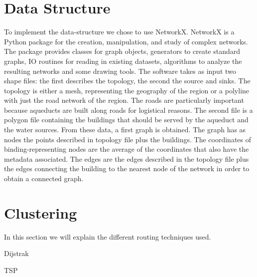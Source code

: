 \section{Data Structure}
\label{data_structure_technical}
To implement the data-structure we chose to use NetworkX. NetworkX is a Python package
for the creation, manipulation, and study of complex networks. The package provides
classes for graph objects, generators to create standard graphs, IO routines for reading in
existing datasets, algorithms to analyze the resulting networks and some drawing tools.
The software takes as input two shape files: the first describes the topology, the second
the source and sinks. The topology is either a mesh, representing the geography of the
region or a polyline with just the road network of the region. The roads are particularly
important because aqueducts are built along roads for logistical reasons. The second file
is a polygon file containing the buildings that should be served by the aqueduct and the
water sources.
From these data, a first graph is obtained. The graph has as nodes the points described
in topology file plus the buildings. The coordinates of binding-representing nodes are the
average of the coordinates that also have the metadata associated. The edges are the edges
described in the topology file plus the edges connecting the building to the nearest node
of the network in order to obtain a connected graph.

\section{Clustering} 
\label{Clustering_thecnical}

\label{Routing_thecnical}
In this section we will explain the different routing techniques used.

Dijstrak


TSP

